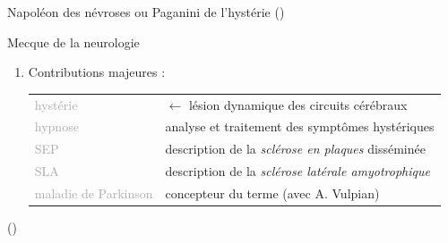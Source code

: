 \begin{frame}{\og{}Napoléon des névroses\fg{} ou \og{}Paganini de l'hystérie\fg{} {\small(\hypersetup{citecolor=yellow}\cite{marmion2015freud})}}
\begin{itemize}
\hspace{165pt}
\footnotesize\og{}Mecque de la neurologie\fg{}
\end{itemize}
\begin{enumerate}[\indent {}]
\item Contributions majeures :
\begin{table}[h!]
\small
\begin{tabular}{l l}
\textcolor{darkgray}{hystérie} & $\leftarrow$ lésion dynamique des circuits cérébraux\\
\textcolor{darkgray}{hypnose} & analyse et traitement des symptômes hystériques\\
\textcolor{darkgray}{SEP} & description de la \textit{sclérose en plaques} disséminée\\
\textcolor{darkgray}{SLA} & description de la \textit{sclérose latérale amyotrophique}\\
\textcolor{darkgray}{maladie de Parkinson} & concepteur du terme (avec A. Vulpian)
\end{tabular}
\end{table}
	\end{enumerate}
	\vspace{-0.3cm}
    \begin{flushright}
{\footnotesize(\cite{camargo2024jean})}
\end{flushright}




\end{frame}

